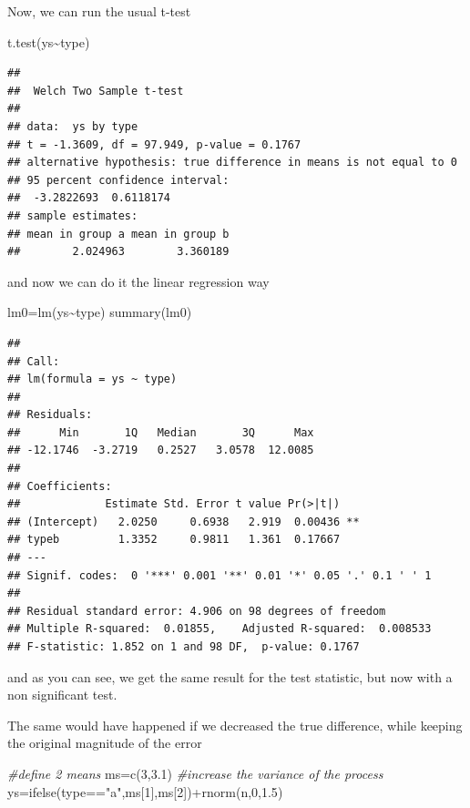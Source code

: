 \documentclass[
]{book}
\newenvironment{Shaded}{\begin{snugshade}}{\end{snugshade}}
\newcommand{\CommentTok}[1]{\textcolor[rgb]{0.56,0.35,0.01}{\textit{#1}}}
\newcommand{\DecValTok}[1]{\textcolor[rgb]{0.00,0.00,0.81}{#1}}
\newcommand{\FloatTok}[1]{\textcolor[rgb]{0.00,0.00,0.81}{#1}}
\newcommand{\FunctionTok}[1]{\textcolor[rgb]{0.00,0.00,0.00}{#1}}
\newcommand{\NormalTok}[1]{#1}
\newcommand{\OtherTok}[1]{\textcolor[rgb]{0.56,0.35,0.01}{#1}}
\newcommand{\SpecialCharTok}[1]{\textcolor[rgb]{0.00,0.00,0.00}{#1}}
\newcommand{\StringTok}[1]{\textcolor[rgb]{0.31,0.60,0.02}{#1}}
\begin{document}
Now, we can run the usual t-test

\begin{Shaded}
\begin{Highlighting}[]
\FunctionTok{t.test}\NormalTok{(ys}\SpecialCharTok{\textasciitilde{}}\NormalTok{type)}
\end{Highlighting}
\end{Shaded}

\begin{verbatim}
## 
##  Welch Two Sample t-test
## 
## data:  ys by type
## t = -1.3609, df = 97.949, p-value = 0.1767
## alternative hypothesis: true difference in means is not equal to 0
## 95 percent confidence interval:
##  -3.2822693  0.6118174
## sample estimates:
## mean in group a mean in group b 
##        2.024963        3.360189
\end{verbatim}

and now we can do it the linear regression way

\begin{Shaded}
\begin{Highlighting}[]
\NormalTok{lm0}\OtherTok{=}\FunctionTok{lm}\NormalTok{(ys}\SpecialCharTok{\textasciitilde{}}\NormalTok{type)}
\FunctionTok{summary}\NormalTok{(lm0)}
\end{Highlighting}
\end{Shaded}

\begin{verbatim}
## 
## Call:
## lm(formula = ys ~ type)
## 
## Residuals:
##      Min       1Q   Median       3Q      Max 
## -12.1746  -3.2719   0.2527   3.0578  12.0085 
## 
## Coefficients:
##             Estimate Std. Error t value Pr(>|t|)   
## (Intercept)   2.0250     0.6938   2.919  0.00436 **
## typeb         1.3352     0.9811   1.361  0.17667   
## ---
## Signif. codes:  0 '***' 0.001 '**' 0.01 '*' 0.05 '.' 0.1 ' ' 1
## 
## Residual standard error: 4.906 on 98 degrees of freedom
## Multiple R-squared:  0.01855,    Adjusted R-squared:  0.008533 
## F-statistic: 1.852 on 1 and 98 DF,  p-value: 0.1767
\end{verbatim}

and as you can see, we get the same result for the test statistic, but now with a non significant test.

The same would have happened if we decreased the true difference, while keeping the original magnitude of the error

\begin{Shaded}
\begin{Highlighting}[]
\CommentTok{\#define 2 means}
\NormalTok{ms}\OtherTok{=}\FunctionTok{c}\NormalTok{(}\DecValTok{3}\NormalTok{,}\FloatTok{3.1}\NormalTok{)}
\CommentTok{\#increase the variance of the process}
\NormalTok{ys}\OtherTok{=}\FunctionTok{ifelse}\NormalTok{(type}\SpecialCharTok{==}\StringTok{"a"}\NormalTok{,ms[}\DecValTok{1}\NormalTok{],ms[}\DecValTok{2}\NormalTok{])}\SpecialCharTok{+}\FunctionTok{rnorm}\NormalTok{(n,}\DecValTok{0}\NormalTok{,}\FloatTok{1.5}\NormalTok{)}
\end{Highlighting}
\end{Shaded}
\end{document}
